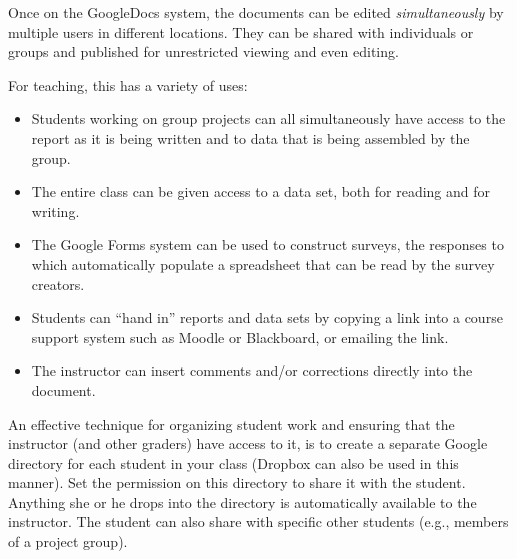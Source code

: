 Once on the GoogleDocs system, the documents can be edited 
{\em  simultaneously} by multiple users in different locations.  They
can be shared with individuals or groups and published for
unrestricted viewing and even editing.

For teaching, this has a variety of uses:
\begin{itemize}
  \item Students working on group projects can all simultaneously have
    access to the report as it is being written and to data that is
    being assembled by the group.
  \item The entire class can be given access to a data set, both for
    reading and for writing.
  \item The Google Forms system can be used to construct surveys, the
    responses to which automatically populate a spreadsheet that can
    be read by the survey creators.
  \item Students can ``hand in'' reports and data sets by copying a link
    into a course support system such as Moodle or Blackboard, or
    emailing the link.
  \item The instructor can insert comments and/or corrections directly
    into the document.
\end{itemize}

An effective technique for organizing student work and ensuring
that the instructor (and other graders) have access to it, is to
create a separate Google directory for each student in your class
(Dropbox can also be used in this manner).
Set the permission on this directory to share it with the
student.  Anything she or he drops into the directory is automatically
available to the instructor.  The student can also share with specific
other students (e.g., members of a project group).

